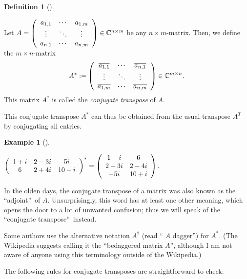 \documentclass[numbers=enddot,12pt,final,onecolumn,notitlepage]{scrartcl}%
\numberwithin{exer}{subsection}
\theoremstyle{definition}
\newtheorem{defi}[theo]{Definition}
\newenvironment{definition}[1][]
{\begin{defi}[#1]\begin{leftbar}}
{\end{leftbar}\end{defi}}
\newtheorem{exam}[theo]{Example}
\newenvironment{example}[1][]
{\begin{exam}[#1]\begin{leftbar}}
{\end{leftbar}\end{exam}}
\begin{document}
\begin{definition}
\label{def.unitary.innerprod.A*}Let $A=\left(
\begin{array}
[c]{ccc}%
a_{1,1} & \cdots & a_{1,m}\\
\vdots & \ddots & \vdots\\
a_{n,1} & \cdots & a_{n,m}%
\end{array}
\right)  \in\mathbb{C}^{n\times m}$ be any $n\times m$-matrix. Then, we define
the $m\times n$-matrix%
\[
A^{\ast}:=\left(
\begin{array}
[c]{ccc}%
\overline{a_{1,1}} & \cdots & \overline{a_{n,1}}\\
\vdots & \ddots & \vdots\\
\overline{a_{1,m}} & \cdots & \overline{a_{n,m}}%
\end{array}
\right)  \in\mathbb{C}^{m\times n}.
\]
This matrix $A^{\ast}$ is called the \emph{conjugate transpose} of $A$.
\end{definition}

This conjugate transpose $A^{\ast}$ can thus be obtained from the usual
transpose $A^{T}$ by conjugating all entries.

\begin{example}
$\left(
\begin{array}
[c]{ccc}%
1+i & 2-3i & 5i\\
6 & 2+4i & 10-i
\end{array}
\right)  ^{\ast}=\left(
\begin{array}
[c]{cc}%
1-i & 6\\
2+3i & 2-4i\\
-5i & 10+i
\end{array}
\right)  $.
\end{example}

In the olden days, the conjugate transpose of a matrix was also known as the
\textquotedblleft adjoint\textquotedblright\ of $A$. Unsurprisingly, this word
has at least one other meaning, which opens the door to a lot of unwanted
confusion; thus we will speak of the \textquotedblleft conjugate
transpose\textquotedblright\ instead.

Some authors use the alternative notation $A^{\dag}$ (read \textquotedblleft%
$A$ dagger\textquotedblright) for $A^{\ast}$. (The Wikipedia suggests calling
it the \textquotedblleft bedaggered matrix $A$\textquotedblright, although I
am not aware of anyone using this terminology outside of the Wikipedia.)

The following rules for conjugate transposes are straightforward to check:
\end{document}
